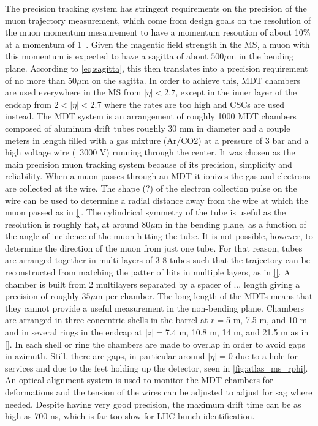 The precision tracking system has stringent requirements
on the precision of the muon trajectory measurement, 
which come from design goals on the resolution of the muon
momentum mesaurement to have a momentum resoution of 
about 10\% at a momentum of 1~\TeV.
Given the magentic field strength in the MS, a muon 
with this momentum is expected to have a sagitta
of about $500\mu$m in the bending plane. 
According to \eqn\eqref{eq:sagitta},
this then translates into a precision requirement of 
no more than $50 \mu$m on the sagitta.
In order to achieve this, MDT chambers are used everywhere 
in the MS from $|\eta|<2.7$, except in the inner layer of the 
endcap from $2<|\eta|<2.7$
where the rates are too high 
and CSCs
are used instead. 
The MDT system is an arrangement of roughly 1000 MDT chambers composed
of aluminum drift tubes roughly 30 mm in diameter and a couple meters in length 
filled with a gas mixture
(Ar/CO2) at a pressure of 3 bar and a high voltage wire (~3000 V)
running through the center. 
It was chosen as the main precision muon tracking system
because of its precision, simplicity and reliability.
When a muon passes through an MDT
it ionizes the gas and electrons are collected at the wire.
The shape (?) of the electron collection pulse on the wire
can be used to determine a radial distance away from the wire
at which the muon passed as in \fig\ref{}. The cylindrical symmetry
of the tube is useful as the resolution is roughly flat, at around
$80\mu$m in the bending plane, as a function
of the angle of incidence of the muon hitting the tube. 
It is not possible, however, to determine the direction
of the muon from just one tube.  For that reason, 
tubes are arranged together in multi-layers of 3-8 tubes such that 
the trajectory
can be reconstructed from matching the patter of hits in multiple layers,
as in \fig\ref{}.
A chamber is built from 2 multilayers separated by a spacer of ... length
giving a precision of roughly $35 \mu$m per chamber.
The long length of the MDTs means that they cannot provide a  useful measurement
in the non-bending plane.
Chambers are arranged in three concentric shells in the barrel 
at $r = $5 m, 7.5 m, and 10 m and in several rings in the endcap
at $|z| = $7.4 m, 10.8 m, 14 m, and 21.5 m as in \fig\ref{}.
In each shell or ring
the chambers are made to overlap in order to avoid gaps in azimuth.
Still, there are gaps, in particular around $|\eta|=0$ due to a hole for services
and due to the feet holding up the detector, seen in \fig\ref{fig:atlas_ms_rphi}.
An optical alignment system is used to monitor the MDT chambers %
for deformations and the tension of the wires can be adjusted
to adjust for sag where needed. %
Despite having very good precision, the maximum drift time
can be as high as 700 ns, which is far too slow for LHC bunch identification.


